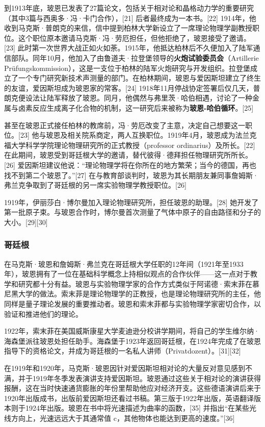 到1913年底，玻恩已发表了27篇论文，包括关于相对论和晶格动力学的重要研究（其中3篇与西奥多·冯·卡门合作），[21] 后者最终成为一本书。[22] 1914年，他收到马克斯·普朗克的来信，信中提到柏林大学新设立了一席理论物理学副教授职位。这个职位原本邀请马克斯·冯·劳厄担任，但他拒绝了，玻恩接受了邀请。[23] 此时第一次世界大战正如火如荼。1915年，他抵达柏林后不久便加入了陆军通信部队。同年10月，他加入了由鲁道夫·拉登堡领导的\textbf{火炮试验委员会}（Artillerie Prüfungskommission），这是一支位于柏林的陆军火炮研究与开发组织。拉登堡成立了一个专门研究新技术声测量的部门。在柏林期间，玻恩与爱因斯坦建立了终生的友谊，爱因斯坦成为玻恩家的常客。[24] 1918年11月停战协定签署后仅几天，普朗克便设法让陆军释放了玻恩。同月，他偶然与弗里茨·哈伯相遇，讨论了一种金属与卤素反应生成离子化合物的机制，这一研究后来被称为\textbf{玻恩-哈伯循环}。[25]  

甚至在玻恩正式接任柏林的教席前，冯·劳厄改变了主意，决定自己想要这一职位。[23] 他与玻恩及相关院系商定，两人互换职位。1919年4月，玻恩成为法兰克福大学科学学院理论物理研究所的正式教授（professor ordinarius）及所长。[22] 在此期间，玻恩受到哥廷根大学的邀请，替代彼得·德拜担任物理研究所所长。[26] 爱因斯坦建议他说：“理论物理学将在你所在的地方繁荣；当今的德国，再也找不到第二个玻恩了。”[27] 在与教育部谈判时，玻恩为其长期朋友兼同事詹姆斯·弗兰克争取到了哥廷根的另一席实验物理学教授职位。[26]  

1919年，伊丽莎白·博尔曼加入理论物理研究所，担任玻恩的助理。[28] 她开发了第一批原子束。与玻恩合作时，博尔曼首次测量了气体中原子的自由路径和分子的大小。[29][30]
\subsubsection{哥廷根}

在马克斯·玻恩和詹姆斯·弗兰克在哥廷根大学任职的12年间（1921年至1933年），玻恩拥有了一位在基础科学概念上持相似观点的合作伙伴——这一点对于教学和研究都十分有益。玻恩与实验物理学家的合作方式类似于阿诺德·索末菲在慕尼黑大学的做法。索末菲是理论物理学的正教授，也是理论物理研究所的主任，他同样是量子理论发展的重要推动者。玻恩和索末菲都与实验物理学家密切合作，以验证和推进他们的理论。

1922年，索末菲在美国威斯康星大学麦迪逊分校讲学期间，将自己的学生维尔纳·海森堡派往玻恩处担任助手。海森堡于1923年返回哥廷根，在1924年完成了在玻恩指导下的资格论文，并成为哥廷根的一名私人讲师（Privatdozent）。[31][32]

在1919年和1920年，马克斯·玻恩因针对爱因斯坦相对论的大量反对意见感到不满，并于1919年冬季发表演讲支持爱因斯坦。玻恩通过这些关于相对论的演讲获得报酬，这在当时快速通货膨胀的年份里帮助他应对经济开支。这些德语演讲后来于1920年出版成书，出版前爱因斯坦还看过书稿。第三版于1922年出版，英语翻译版本则于1924年出版。玻恩在书中将光速描述为曲率的函数，[35] 并指出“在某些光线方向上，光速远远大于其通常值 c，其他物体也能达到更高的速度。”[36]

